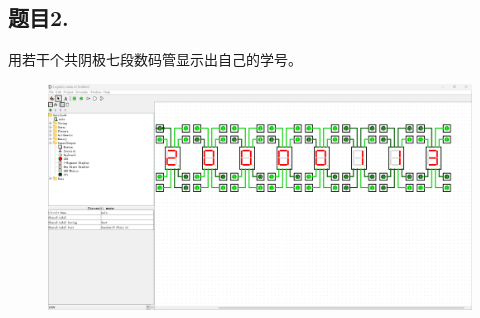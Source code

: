 \documentclass{article}
\begin{document}
		\subsection*{题目2.}用若干个共阴极七段数码管显示出自己的学号。
		\begin{figure}[H]
			\centering
			\includegraphics[scale=0.18]{1-2.png}
		\end{figure}
\end{document}
